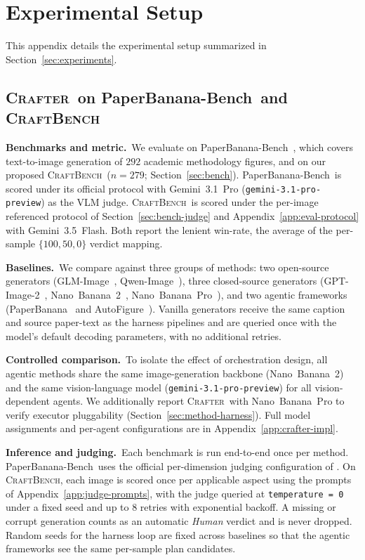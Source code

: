 \documentclass{article}
\newcommand{\Crafter}{\textsc{Crafter}\xspace}
\newcommand{\CrafterBench}{\textsc{CraftBench}\xspace}
\newcommand{\PaperBananaBench}{PaperBanana-Bench\xspace}
\begin{document}
\section{Experimental Setup}
\label{app:experiment_setup}

This appendix details the experimental setup summarized in Section~\ref{sec:experiments}.

\subsection{\Crafter\ on \PaperBananaBench\ and \CrafterBench}
\label{app:setup-crafter}

\noindent\textbf{Benchmarks and metric.}\
We evaluate on \PaperBananaBench~\citep{zhu2026paperbanana}, which covers text-to-image generation of $292$ academic methodology figures, and on our proposed \CrafterBench\ ($n{=}279$; Section~\ref{sec:bench}). \PaperBananaBench\ is scored under its official protocol with Gemini~3.1~Pro (\texttt{gemini-3.1-pro-preview}) as the VLM judge. \CrafterBench\ is scored under the per-image referenced protocol of Section~\ref{sec:bench-judge} and Appendix~\ref{app:eval-protocol} with Gemini~3.5~Flash. Both report the lenient win-rate, the average of the per-sample $\{100, 50, 0\}$ verdict mapping.

\noindent\textbf{Baselines.}\
We compare against three groups of methods: two open-source generators (GLM-Image~\citep{glm2025image}, Qwen-Image~\citep{qwen2025image}), three closed-source generators (GPT-Image-2~\citep{openai2025gptimage2}, Nano~Banana~2~\citep{google2025nanobanana2}, Nano~Banana~Pro~\citep{google2025nanobananapro}), and two agentic frameworks (PaperBanana~\citep{zhu2026paperbanana} and AutoFigure~\citep{zhu2026autofigure}). Vanilla generators receive the same caption and source paper-text as the harness pipelines and are queried once with the model's default decoding parameters, with no additional retries.

\noindent\textbf{Controlled comparison.}\
To isolate the effect of orchestration design, all agentic methods share the same image-generation backbone (Nano~Banana~2) and the same vision-language model (\texttt{gemini-3.1-pro-preview}) for all vision-dependent agents. We additionally report \Crafter\ with Nano~Banana~Pro to verify executor pluggability (Section~\ref{sec:method-harness}). Full model assignments and per-agent configurations are in Appendix~\ref{app:crafter-impl}.

\noindent\textbf{Inference and judging.}\
Each benchmark is run end-to-end once per method.
\PaperBananaBench\ uses the official per-dimension judging
configuration of \citet{zhu2026paperbanana}. On \CrafterBench, each
image is scored once per applicable aspect using the prompts of
Appendix~\ref{app:judge-prompts}, with the judge queried at
\texttt{temperature\,=\,0} under a fixed seed and up to $8$ retries
with exponential backoff. A missing or corrupt generation counts as
an automatic \textit{Human} verdict and is never dropped.
Random seeds for the harness loop are fixed across baselines so
that the agentic frameworks see the same per-sample plan
candidates.
\end{document}
